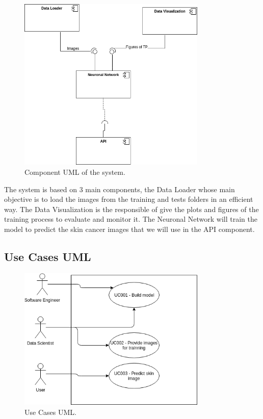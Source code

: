 \begin{figure}[H]
\centering
\includegraphics[width=0.8\textwidth]{./figures/component-uml}
\caption{Component UML of the system.}
\end{figure}

The system is based on 3 main components, the Data Loader whose main objective is to load the images from the training and tests folders in an efficient way. The Data Visualization is the responsible of give the plots and figures of the training process to evaluate and monitor it. The Neuronal Network will train the model to predict the skin cancer images that we will use in the API component. 


\subsection{Use Cases UML}


\begin{figure}[H]
\centering
\includegraphics[width=0.8\textwidth]{./figures/use-case-uml}
\caption{Use Cases UML.}
\end{figure}

